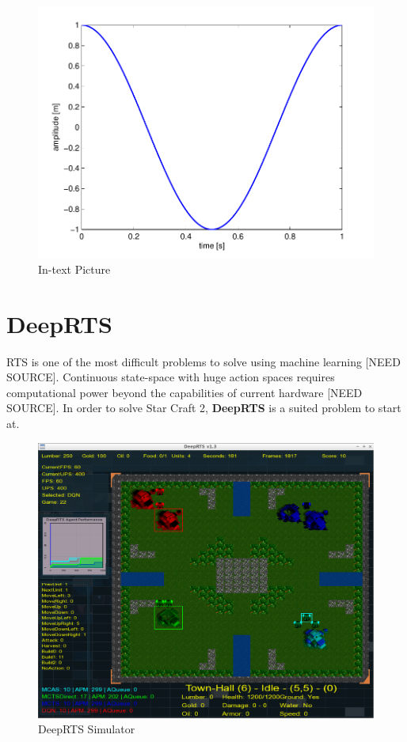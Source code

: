 \documentclass[fleqn,10pt]{SelfArx} %
\begin{document}
\begin{figure}[ht]\centering
\includegraphics[width=\linewidth]{results}
\caption{In-text Picture}
\label{fig:results}
\end{figure}

\section{DeepRTS}
RTS is one of the most difficult problems to solve using machine learning [NEED SOURCE]. Continuous state-space with huge action spaces requires computational power beyond the capabilities of current hardware [NEED SOURCE]. In order to solve Star Craft 2, \textbf{DeepRTS} is a suited problem to start at.


\begin{figure}[ht]\centering
\includegraphics[width=\linewidth]{deep_rts}
\caption{DeepRTS Simulator}
\label{fig:results}
\end{figure}
\end{document}
